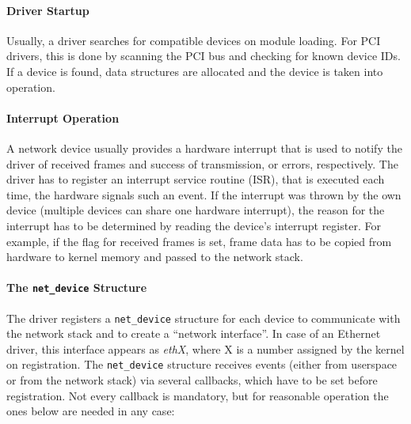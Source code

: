 \documentclass[a4paper,12pt,BCOR6mm,bibtotoc,idxtotoc]{scrbook}
\begin{document}
\paragraph{Driver Startup} Usually, a driver searches for compatible devices
on module loading.  For PCI drivers, this is done by scanning the PCI bus and
checking for known device IDs. If a device is found, data structures are
allocated and the device is taken into operation.

\paragraph{Interrupt Operation} A network device usually
provides a hardware interrupt that is used to notify the driver of received
frames and success of transmission, or errors, respectively. The driver has to
register an interrupt service routine
(ISR), that is
executed each time, the hardware signals such an event. If the interrupt was
thrown by the own device (multiple devices can share one hardware interrupt),
the reason for the interrupt has to be determined by reading the device's
interrupt register. For example, if the flag for received frames is set, frame
data has to be copied from hardware to kernel memory and passed to the network
stack.

\paragraph{The \lstinline+net_device+ Structure} The driver
registers a \lstinline+net_device+ structure for each device to communicate
with the network stack and to create a ``network interface''. In case of an
Ethernet driver, this interface appears as \textit{ethX}, where X is a number
assigned by the kernel on registration. The \lstinline+net_device+ structure
receives events (either from userspace or from the network stack) via several
callbacks, which have to be set before registration. Not every callback is
mandatory, but for reasonable operation the ones below are needed in any case:

\newsavebox\boxopen
\sbox{}
\newsavebox\boxstop
\sbox{}
\newsavebox\boxxmit
\sbox{}
\newsavebox\boxstats
\sbox{}
\end{document}
